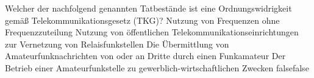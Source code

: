     {Welcher der nachfolgend genannten Tatbestände ist eine Ordnungswidrigkeit gemäß Telekommunikationsgesetz (TKG)?}
    {Nutzung von Frequenzen ohne Frequenzzuteilung}
    {Nutzung von öffentlichen Telekommunikationseinrichtungen zur Vernetzung von Relaisfunkstellen}
    {Die Übermittlung von Amateurfunknachrichten von oder an Dritte durch einen Funkamateur}
    {Der Betrieb einer Amateurfunkstelle zu gewerblich-wirtschaftlichen Zwecken}
    {false}{false}